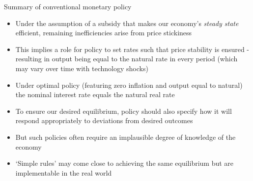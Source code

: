 \begin{frame}{Summary of conventional monetary policy}

\begin{itemize}
\item	Under the assumption of a subsidy that makes our economy's \emph{steady state} efficient, remaining inefficiencies arise from price stickiness
\item	This implies a role for policy to set rates such that price stability is ensured - resulting in output being equal to the natural rate in every period (which may vary over time with technology shocks)
\item	Under optimal policy (featuring zero inflation and output equal to natural) the nominal interest rate equals the natural real rate
\item	To ensure our desired equilibrium, policy should also specify how it will respond appropriately to deviations from desired outcomes
\item	But such policies often require an implausible degree of knowledge of the economy
\item	`Simple rules' may come close to achieving the same equilibrium but are implementable in the real world
\end{itemize}

\end{frame}